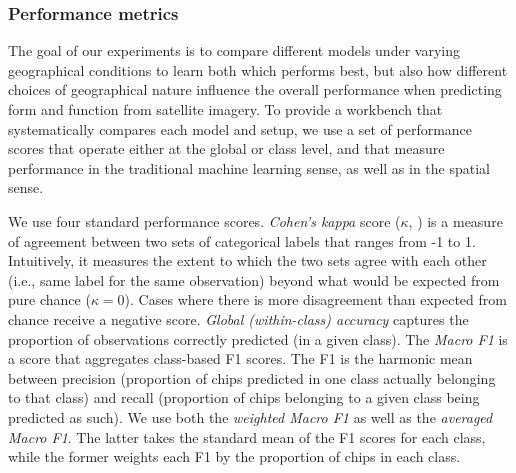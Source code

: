 \subsubsection{Performance metrics}

The goal of our experiments is to compare different models under varying
geographical conditions to learn both which performs best, but also how
different choices of geographical nature influence the overall performance
when predicting form and function from satellite imagery.
To provide a workbench that systematically compares each model and setup, we
use a set of performance scores that operate either at the global or class level,
and that measure performance in the traditional machine learning sense, as
well as in the spatial sense.

We use four standard performance scores. \textit{Cohen's kappa} score ($\kappa$,
\citealp{cohen1960coefficient}) is a measure of agreement between two sets of
categorical labels that ranges from -1 to 1. Intuitively, it measures the
extent to which the two sets agree with each other (i.e., same label for the
same observation) beyond what would be expected from pure chance
($\kappa=0$). Cases where there is more disagreement than expected from chance
receive a negative score. \textit{Global (within-class) accuracy} captures the
proportion of observations correctly predicted (in a given class). The
\textit{Macro F1} is a score that aggregates class-based F1
scores. The F1 is the harmonic mean between precision (proportion of
chips predicted in one class actually belonging to that class) and recall
(proportion of chips belonging to a given class being predicted as such).
We use both the \textit{weighted Macro F1} as well as the \textit{averaged
Macro F1}. The latter takes the standard mean of the F1 scores for each class,
while the former weights each F1 by the proportion of chips in each class.

